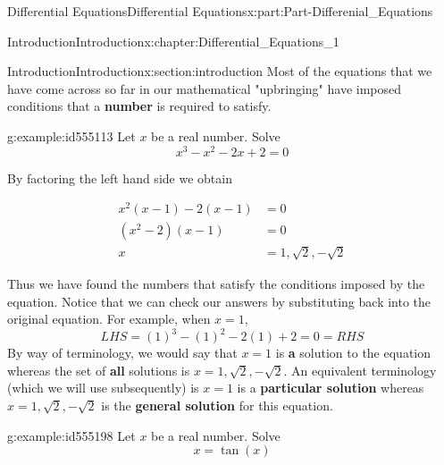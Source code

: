 \documentclass[oneside,10pt,]{book}
\newcommand{\terminology}[1]{\textbf{#1}}
\numberwithin{equation}{section}
\newcommand{\amp}{&}
\begin{document}
\begin{partptx}{Differential Equations}{}{Differential Equations}{}{}{x:part:Part-Differenial_Equations}
%
\typeout{************************************************}
\typeout{************************************************}
%
\begin{chapterptx}{Introduction}{}{Introduction}{}{}{x:chapter:Differential_Equations_1}
%
%
\typeout{************************************************}
\typeout{************************************************}
%
\begin{sectionptx}{Introduction}{}{Introduction}{}{}{x:section:introduction}
Most of the equations that we have come across so far in our mathematical "upbringing" have imposed conditions that a \terminology{number} is required to satisfy.%
\begin{example}{}{g:example:id555113}%
Let \(x\) be a real number. Solve%
\begin{equation*}
x^3-x^2-2x+2=0 
\end{equation*}
%
\par\smallskip%
\noindent\hypertarget{g:solution:id555150}{}By factoring the left hand side we obtain%
\par
%
\begin{align*}
x^2(x-1)-2(x-1) \amp =0\\
(x^2-2)(x-1)\amp =0\\
x \amp =1,\sqrt{2},-\sqrt{2}
\end{align*}
%
\par
Thus we have found the numbers that satisfy the conditions imposed by the equation. Notice that we can check our answers by substituting back into the original equation. For example, when \(x=1\),%
\begin{equation*}
LHS=(1)^3-(1)^2-2(1)+2=0=RHS
\end{equation*}
By way of terminology, we would say that \(x=1\) is \terminology{a} solution to the equation whereas the set of \terminology{all} solutions is \(x=1,\sqrt{2},-\sqrt{2}\). An equivalent terminology (which we will use subsequently) is \(x=1\) is a \terminology{particular solution} whereas \(x=1,\sqrt{2},-\sqrt{2}\) is the \terminology{general solution} for this equation.%
\end{example}
\begin{example}{}{g:example:id555198}%
Let \(x\) be a real number. Solve%
\begin{equation*}
x=\tan(x) 
\end{equation*}

\end{example}
\end{sectionptx}
\end{chapterptx}
\end{partptx}
\end{document}

